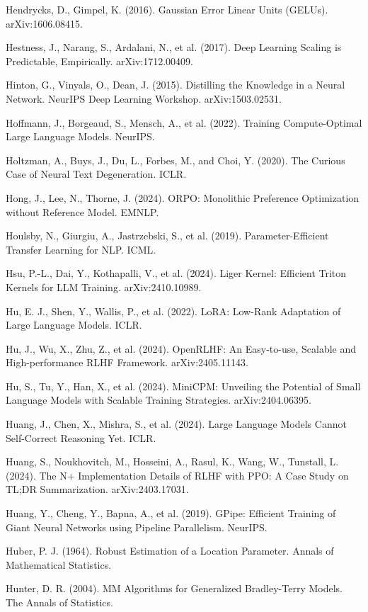 {\begin{enumerate}[leftmargin=*,itemsep=1pt,label={[\arabic*]}]
\item Hendrycks, D., Gimpel, K. (2016). Gaussian Error Linear Units (GELUs). arXiv:1606.08415.
\item Hestness, J., Narang, S., Ardalani, N., et al. (2017). Deep Learning Scaling is Predictable, Empirically. arXiv:1712.00409.
\item Hinton, G., Vinyals, O., Dean, J. (2015). Distilling the Knowledge in a Neural Network. NeurIPS Deep Learning Workshop. arXiv:1503.02531.
\item Hoffmann, J., Borgeaud, S., Mensch, A., et al. (2022). Training Compute-Optimal Large Language Models. NeurIPS.
\item Holtzman, A., Buys, J., Du, L., Forbes, M., and Choi, Y. (2020). The Curious Case of Neural Text Degeneration. ICLR.
\item Hong, J., Lee, N., Thorne, J. (2024). ORPO: Monolithic Preference Optimization without Reference Model. EMNLP.
\item Houlsby, N., Giurgiu, A., Jastrzebski, S., et al. (2019). Parameter-Efficient Transfer Learning for NLP. ICML.
\item Hsu, P.-L., Dai, Y., Kothapalli, V., et al. (2024). Liger Kernel: Efficient Triton Kernels for LLM Training. arXiv:2410.10989.
\item Hu, E. J., Shen, Y., Wallis, P., et al. (2022). LoRA: Low-Rank Adaptation of Large Language Models. ICLR.
\item Hu, J., Wu, X., Zhu, Z., et al. (2024). OpenRLHF: An Easy-to-use, Scalable and High-performance RLHF Framework. arXiv:2405.11143.
\item Hu, S., Tu, Y., Han, X., et al. (2024). MiniCPM: Unveiling the Potential of Small Language Models with Scalable Training Strategies. arXiv:2404.06395.
\item Huang, J., Chen, X., Mishra, S., et al. (2024). Large Language Models Cannot Self-Correct Reasoning Yet. ICLR.
\item Huang, S., Noukhovitch, M., Hosseini, A., Rasul, K., Wang, W., Tunstall, L. (2024). The N+ Implementation Details of RLHF with PPO: A Case Study on TL;DR Summarization. arXiv:2403.17031.
\item Huang, Y., Cheng, Y., Bapna, A., et al. (2019). GPipe: Efficient Training of Giant Neural Networks using Pipeline Parallelism. NeurIPS.
\item Huber, P. J. (1964). Robust Estimation of a Location Parameter. Annals of Mathematical Statistics.
\item Hunter, D. R. (2004). MM Algorithms for Generalized Bradley-Terry Models. The Annals of Statistics.

\end{enumerate}}
